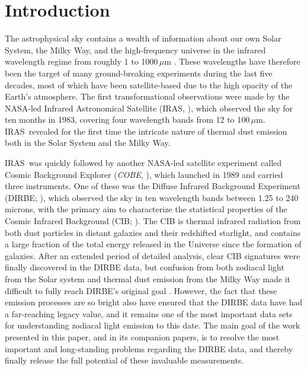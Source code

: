 \documentclass{aa}
\def\COBE{\textit{COBE}}
\def\IRAS{\textrm{{IRAS}}}
\begin{document}

   \maketitle

\setcounter{tocdepth}{2}
\tableofcontents
   
\section{Introduction}


The astrophysical sky contains a wealth of information about our own Solar System, the Milky Way, and the high-frequency universe in the infrared wavelength regime from roughly 1 to 1000\,$\mu$m \citep[e.g.,][]{johnson:1966,soifer:1987,gardner:2006}. These wavelengths have therefore been the target of many ground-breaking experiments during the last five decades, most of which have been satellite-based due to the high opacity of the Earth's atmosphere. The first transformational observations were made by the NASA-led Infrared Astronomical Satellite (\IRAS, \citealt{neugebauer:1984}), which observed the sky for ten months in 1983, covering four wavelength bands from 12 to 100$\,\mu$m. \IRAS\ revealed for the first time the intricate nature of thermal dust emission both in the Solar System and the Milky Way.

\IRAS\ was quickly followed by another NASA-led satellite experiment called Cosmic Background Explorer (\COBE, \citealt{boggess92}), which launched in 1989 and carried three instruments. One of these was the Diffuse Infrared Background Experiment (DIRBE; \citealp{hauser1998}), which observed the sky in ten wavelength bands between 1.25 to 240 microns, with the primary aim to characterize the statistical properties of the Cosmic Infrared Background (CIB; \citealp{partridge1967}). The CIB is thermal infrared radiation from both dust particles in distant galaxies and their redshifted starlight, and contains a large fraction of the total energy released in the Universe since the formation of galaxies. After an extended period of detailed analysis, clear CIB signatures were finally discovered in the DIRBE data, but confusion from both zodiacal light from the Solar system and thermal dust emission from the Milky Way made it difficult to fully reach DIRBE's original goal \citep{arendt1998,hauser1998,kelsall1998}. However, the fact that these emission processes are so bright also have ensured that the DIRBE data have had a far-reaching legacy value, and it remains one of the most important data sets for understanding zodiacal light emission to this date. The main goal of the work presented in this paper, and in its companion papers, is to resolve the most important and long-standing problems regarding the DIRBE data, and thereby finally release the full potential of these invaluable measurements.
\end{document}
